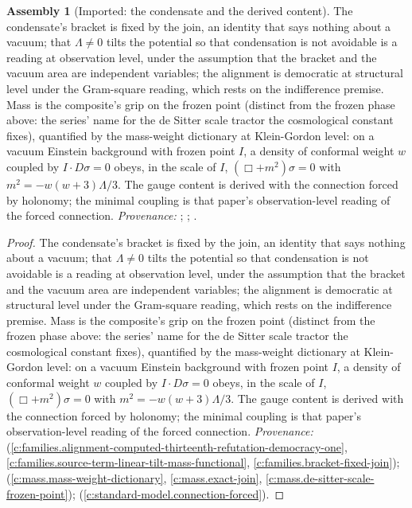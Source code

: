 \documentclass[11pt]{article}
\theoremstyle{definition}
\newtheorem{assembled}[theorem]{Assembly}
\theoremstyle{plain}
\begin{document}
\begin{assembled}[Imported: the condensate and the derived content]\label{c:one-relation.imported-condensate-derived-content}
The condensate's bracket is fixed by the join, an identity that says nothing about a vacuum; that $\Lambda \neq 0$ tilts the potential so that condensation is not avoidable is a reading at observation level, under the assumption that the bracket and the vacuum area are independent variables; the alignment is democratic at structural level under the Gram-square reading, which rests on the indifference premise. Mass is the composite's grip on the frozen point (distinct from the frozen phase above: the series' name for the de Sitter scale tractor the cosmological constant fixes), quantified by the mass-weight dictionary at Klein-Gordon level: on a vacuum Einstein background with frozen point $I$, a density of conformal weight $w$ coupled by $I \cdot D\sigma = 0$ obeys, in the scale of $I$, $(\Box + m^{2})\sigma = 0$ with $m^{2} = -w(w+3)\Lambda/3$. The gauge content is derived with the connection forced by holonomy; the minimal coupling is that paper's observation-level reading of the forced connection. \emph{Provenance:} \cite[Prop.~4.1, Prop.~4.2(2), Prop.~4.3(3)]{ButlerT13}; \cite[Thm.~3.1, Lem.~5.1, Def.~5.4, Thm.~5.6]{ButlerT11}; \cite[Prop.~5.7 and the paragraph following it]{ButlerT12}.
\end{assembled}
\begin{proof}
The condensate's bracket is fixed by the join, an identity that says nothing about a vacuum; that $\Lambda \neq 0$ tilts the potential so that condensation is not avoidable is a reading at observation level, under the assumption that the bracket and the vacuum area are independent variables; the alignment is democratic at structural level under the Gram-square reading, which rests on the indifference premise. Mass is the composite's grip on the frozen point (distinct from the frozen phase above: the series' name for the de Sitter scale tractor the cosmological constant fixes), quantified by the mass-weight dictionary at Klein-Gordon level: on a vacuum Einstein background with frozen point $I$, a density of conformal weight $w$ coupled by $I \cdot D\sigma = 0$ obeys, in the scale of $I$, $(\Box + m^{2})\sigma = 0$ with $m^{2} = -w(w+3)\Lambda/3$. The gauge content is derived with the connection forced by holonomy; the minimal coupling is that paper's observation-level reading of the forced connection. \emph{Provenance:} \cite[Prop.~4.1, Prop.~4.2(2), Prop.~4.3(3)]{ButlerT13} (\ref{c:families.alignment-computed-thirteenth-refutation-democracy-one}, \ref{c:families.source-term-linear-tilt-mass-functional}, \ref{c:families.bracket-fixed-join}); \cite[Thm.~3.1, Lem.~5.1, Def.~5.4, Thm.~5.6]{ButlerT11} (\ref{c:mass.mass-weight-dictionary}, \ref{c:mass.exact-join}, \ref{c:mass.de-sitter-scale-frozen-point}); \cite[Prop.~5.7 and the paragraph following it]{ButlerT12} (\ref{c:standard-model.connection-forced}).

\end{proof}
\end{document}
